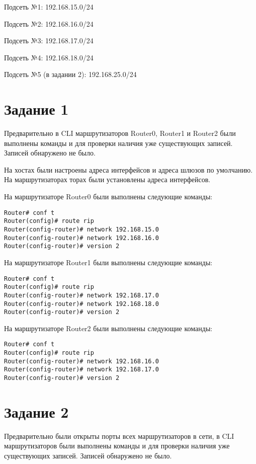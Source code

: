 Подсеть №1: 192.168.15.0/24

Подсеть №2: 192.168.16.0/24

Подсеть №3: 192.168.17.0/24

Подсеть №4: 192.168.18.0/24

Подсеть №5 (в задании 2): 192.168.25.0/24

\section*{Задание 1}

Предварительно в CLI маршрутизаторов Router0, Router1 и Router2 были выполнены команды  и   для проверки наличия уже существующих записей. Записей обнаружено не было.

На хостах были настроены адреса интерфейсов и адреса шлюзов по умолчанию. На маршрутизаторах торах были установлены адреса интерфейсов.

На маршрутизаторе Router0 были выполнены следующие команды:
\begin{lstlisting}[numbers=none]
Router# conf t
Router(config)# route rip
Router(config-router)# network 192.168.15.0
Router(config-router)# network 192.168.16.0
Router(config-router)# version 2
\end{lstlisting}

На маршрутизаторе Router1 были выполнены следующие команды:
\begin{lstlisting}[numbers=none]
Router# conf t
Router(config)# route rip
Router(config-router)# network 192.168.17.0
Router(config-router)# network 192.168.18.0
Router(config-router)# version 2
\end{lstlisting}

На маршрутизаторе Router2 были выполнены следующие команды:
\begin{lstlisting}[numbers=none]
Router# conf t
Router(config)# route rip
Router(config-router)# network 192.168.16.0
Router(config-router)# network 192.168.17.0
Router(config-router)# version 2
\end{lstlisting}

\section*{Задание 2}

Предварительно были открыты порты всех маршрутизаторов в сети, в CLI маршрутизаторов были выполнены команды  и   для проверки наличия уже существующих записей. Записей обнаружено не было.

